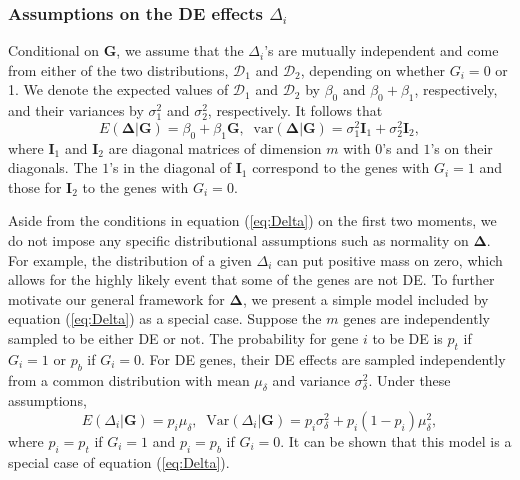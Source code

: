 \documentclass[a4,center,fleqn]{NAR}
\begin{document}
	\subsubsection{Assumptions on the DE effects $\Delta_i$}\label{subsection:DeltaModel}
	Conditional on $\bm G$, we assume that the $\Delta_i$'s are mutually independent and come from
	either of the two distributions, $\mathscr{D}_1$ and $\mathscr{D}_2$, depending on whether $G_i=0$
	or 1. We denote the expected values of $\mathscr{D}_1$ and $\mathscr{D}_2$ by $\beta_0$ and
	$\beta_0+\beta_1$, respectively, and their variances by $\sigma_1^2$ and $\sigma_2^2$, respectively.
	It follows that 
	\begin{equation}
	\label{eq:Delta}
	E(\bm \Delta|\bm G)=\beta_0 + \beta_1 \bm G,\;\; \mbox{var}(\bm \Delta|\bm G) = \sigma_1^2\bm
	I_1+\sigma_2^2\bm I_2,
	\end{equation} 
	where $\bm I_1$ and $\bm I_2$ are diagonal matrices of dimension $m$ with $0$'s and $1$'s on their
	diagonals. The $1$'s in the diagonal of $\bm I_1$ correspond to the genes with $G_i=1$ and those for
	$\bm I_2$ to the genes with $G_i=0$.
	
	Aside from the conditions in equation (\ref{eq:Delta}) on the first two moments, we do not 
	impose
	any specific distributional assumptions such as normality on $\bm \Delta$. For example, the
	distribution of a given $\Delta_i$ can put positive mass on zero, which allows for the highly likely
	event that some of the genes are not DE. To further motivate our general framework for $\bm \Delta$,
	we present a simple model included by equation (\ref{eq:Delta}) as a special case. Suppose the 
	$m$
	genes are independently sampled to be either DE or not. The probability for gene $i$ to be DE is
	$p_t$ if $G_i=1$ or $p_b$ if $G_i=0$. For DE genes, their DE effects are sampled independently from
	a common distribution with mean $\mu_\delta$ and variance $\sigma^2_\delta$. Under these
	assumptions, 
	\begin{equation}
	\label{eq:DeltaBinom}
	E(\Delta_i|\bm G) = p_i\mu_{\delta},\;\; \text{Var}(\Delta_i|\bm G)= p_i\sigma_{\delta}^2 +
	p_i(1-p_i)\mu_{\delta}^2,
	\end{equation}
	where $p_i=p_{t}$ if $G_i=1$ and $p_i=p_{b}$ if $G_i=0$. It can be shown that this model is a
	special case of equation (\ref{eq:Delta}).
	
\end{document}
